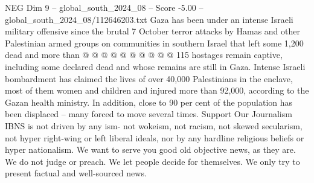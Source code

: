 \begin{textsample}{NEG Dim 9 – global\_south\_2024\_08 – Score -5.00 – global\_south\_2024\_08/112646203.txt}
Gaza has been under an intense Israeli military offensive since the brutal 7 October terror attacks by Hamas and other Palestinian armed groups on communities in southern Israel that left some 1,200 dead and more than @ @ @ @ @ @ @ @ @ @ 115 hostages remain captive, including some declared dead and whose remains are still in Gaza.
Intense Israeli bombardment has claimed the lives of over 40,000 Palestinians in the enclave, most of them women and children and injured more than 92,000, according to the Gazan health ministry.
In addition, close to 90 per cent of the population has been displaced -- many forced to move several times.
Support Our Journalism IBNS is not driven by any ism- not wokeism, not racism, not skewed secularism, not hyper right-wing or left liberal ideals, nor by any hardline religious beliefs or hyper nationalism.
We want to serve you good old objective news, as they are.
We do not judge or preach.
We let people decide for themselves.
We only try to present factual and well-sourced news.

\end{textsample}
